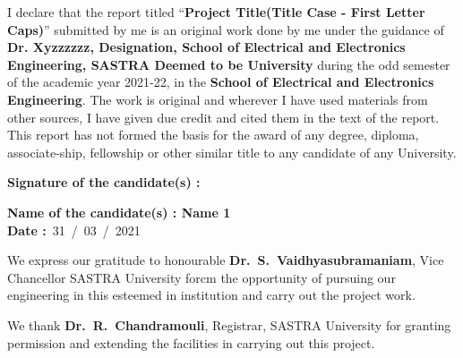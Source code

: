 \documentclass[a4paper, 12pt, oneside]{sastra}
\begin{document}
\begin{doublespace}
	\linespread{2}
	
	I declare that the report titled ``\textbf{Project Title(Title Case - First Letter Caps)}'' submitted by me is an original work done by me under the guidance of \textbf{Dr. Xyzzzzzz, Designation, School of Electrical and Electronics Engineering, SASTRA Deemed to be University} during the odd semester of the academic year 2021-22, in the \textbf{School of Electrical and Electronics Engineering}. The work is original and wherever I have used materials from other sources, I have given due credit and cited them in the text of the report. This report has not formed the basis for the award of any degree, diploma, associate-ship, fellowship or other similar title to any candidate of any University.\\
	
\end{doublespace}

\noindent\textbf{Signature of the candidate(s)	:}	

\noindent\textbf{Name of the candidate(s)\hspace{7mm}		: Name 1}\\

\noindent\textbf{Date\hspace*{43.5mm}					:}~31~/~03~/~2021\\%

\newpage

\externalcertificate




	
	
	
	
	\acknowledgements
	
	\hspace*{12pt} We express our gratitude to honourable \textbf{Dr.~S.~Vaidhyasubramaniam}, Vice Chancellor SASTRA University forcm the opportunity of pursuing our engineering in this esteemed in institution and carry out the project work.
	
	\par We thank \textbf{Dr.~R.~Chandramouli}, Registrar, SASTRA University for granting permission and extending the facilities in carrying out this project.
	
\end{document}

